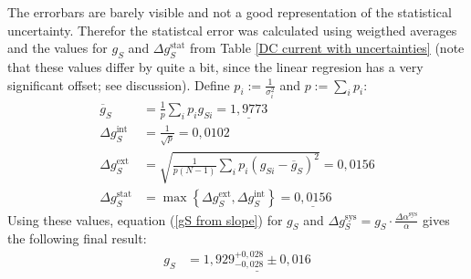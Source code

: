 \documentclass[a4paper,12pt]{article}
\newcommand{\kla}{}
\newcommand{\klammer}{}
\newcommand{\tecxt}{}
\begin{document}
The errorbars are barely visible and not a good representation of the statistical uncertainty. Therefor the statistcal error was calculated using weigthed averages and the values for $g_S$ and $\Delta g_S^\tecxt\text{stat}$ from Table \ref{DC current with uncertainties} (note that these values differ by quite a bit, since the linear regresion has a very significant offset; see discussion). Define $p_i := \frac{1}{\sigma_i^2}$ and $p:=\sum_ip_i$:
\begin{align*}
\overline{g}_S&=\frac{1}{p}\sum_ip_ig_{Si}=\underline{1,9773}\\
\Delta g_S^\tecxt\text{int}&=\frac{1}{\sqrt{p}}=0,0102\\
\Delta g_S^\tecxt\text{ext}&=\sqrt{\frac{1}{p(N-1)}\sum_ip_i\kla\left( {g_{Si}-\overline{g}_S} \right)^2}=0,0156\\
\Delta g_S^\tecxt\text{stat}&=\max\klammer\left\{{\Delta g_S^\tecxt\text{ext},\Delta g_S^\tecxt\text{int}} \right\}=\underline{0,0156}
\end{align*}
Using these values, equation (\ref{gS from slope}) for $g_S$ and $\Delta g_S^\tecxt\text{sys}=g_S\cdot \frac{\Delta\alpha^\tecxt\text{sys}}{\alpha}$ gives the following final result:
\begin{align*}
g_S&=\underline{1,929_{-0,028}^{+0,028}\pm 0,016}
\end{align*}
\end{document}
